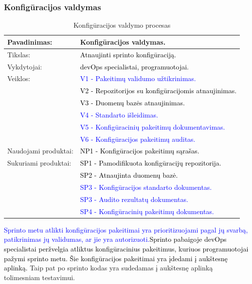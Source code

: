 \documentclass{VUMIFPSkursinis}
\begin{document}
		
	\subsubsection{Konfigūracijos valdymas}
	\begin{center}
		\begin{table}[ht]
			\caption{Konfigūracijos valdymo procesas}
			\begin{tabular}{ | l | l | }
				\hline
				Pavadinimas:         & Konfigūracijos valdymas.				\\ \hline
				Tikslas:             & \textcolor{black}{Atnaujinti sprinto konfigūraciją.}			\\ \hline
				Vykdytojai:          & \textcolor{black}{devOps specialistai, programuotojai.}			\\ \hline
				Veiklos:             	& \textcolor{blue}{V1 - Pakeitimų validumo užtikrinimas.	}		\\ \hline
														& \textcolor{black}{V2 - Repozitorijos su konfigūracijomis atnaujinimas.}	\\
														 & \textcolor{black}{V3 - Duomenų bazės atnaujinimas.	}		\\ \hline
														 & \textcolor{blue}{V4 - Standarto išleidimas.	}		\\ \hline
														 & \textcolor{blue}{V5 - Konfigūracinių pakeitimų dokumentavimas.	}		\\ \hline
														 & \textcolor{blue}{V6 - Konfigūracijos pakeitimų auditas.	}		\\ \hline
				Naudojami produktai: & \textcolor{black}{NP1 - Konfigūracijos pakeitimų sąrašas.	}	\\ \hline
				Sukuriami produktai: & \textcolor{black}{SP1 - Pamodifikuota konfigūracijų repozitorija. }	\\
														 & \textcolor{black}{SP2 - Atnaujinta duomenų bazė. }			\\ \hline
														 & \textcolor{blue}{SP3 - Konfigūracijos standarto dokumentas. }			\\ \hline
														 & \textcolor{blue}{SP3 - Audito rezultatų dokumentas. }			\\ \hline
														 & \textcolor{blue}{SP4 - Konfigūracinių pakeitimų dokumentas. }			\\ \hline
			\end{tabular}
		\end{table}
	\end{center}
		\textcolor{blue}{Sprinto metu atlikti konfigūracijos pakeitimai yra prioritizuojami pagal jų svarbą, patikrinimas jų validumas, ar jie yra autorizuoti.}\textcolor{black}{Sprinto pabaigoje devOps specialistai peržvelgia atliktus konfigūracinius pakeitimus, kuriuos programuotojai pažymi sprinto metu.
		Šie konfigūracijos pakeitimai yra įdedami į aukštesnę aplinką.} Taip pat po sprinto kodas yra sudedamas į aukštesnę aplinką tolimesniam testavimui.
\end{document}
